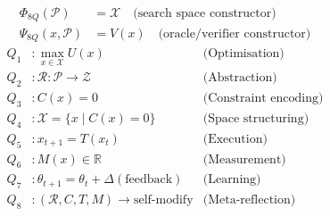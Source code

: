 \begin{align}
\Phi_{8Q}(\mathcal{P}) &= \mathcal{X} \quad \text{(search space constructor)} \\
\Psi_{8Q}(x, \mathcal{P}) &= V(x) \quad \text{(oracle/verifier constructor)}
\end{align}
\begin{align}
Q_1 &: \max_{x \in \mathcal{X}} U(x) & \text{(Optimisation)} \\
Q_2 &: \mathcal{R} : \mathcal{P} \rightarrow \mathcal{Z} & \text{(Abstraction)} \\
Q_3 &: C(x) = 0 & \text{(Constraint encoding)} \\
Q_4 &: \mathcal{X} = \{x \mid C(x)=0\} & \text{(Space structuring)} \\
Q_5 &: x_{t+1} = T(x_t) & \text{(Execution)} \\
Q_6 &: M(x) \in \mathbb{R} & \text{(Measurement)} \\
Q_7 &: \theta_{t+1} = \theta_t + \Delta(\text{feedback}) & \text{(Learning)} \\
Q_8 &: (\mathcal{R}, C, T, M) \rightarrow \text{self-modify} & \text{(Meta-reflection)}
\end{align}
